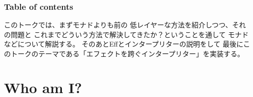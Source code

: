\begin{frame}
  \frametitle{Table of contents}

  \tableofcontents

  \begin{notes}
    \item このトークでは、まずモナドよりも前の
    低レイヤーな方法を紹介しつつ、それの問題と
    これまでどういう方法で解決してきたか？ということを通して
    モナドなどについて解説する。
    そのあとEffとインタープリターの説明をして
    最後にこのトークのテーマである「エフェクトを跨ぐインタープリター」を実装する。
  \end{notes}
\end{frame}

\section{Who am I?}
